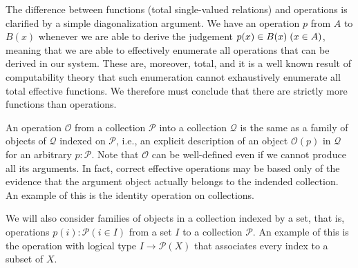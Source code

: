 The difference between functions (total single-valued relations) and operations
is clarified by a simple diagonalization argument. We have an operation $p$
from $A$ to $B(x)$ whenever we are able to derive the judgement
$p(x) \in B(x) \; (x \in A)$, meaning that we are able to effectively enumerate
all operations that can be derived in our system. These are, moreover, total, and
it is a well known result of computability theory that such enumeration cannot
exhaustively enumerate all total effective functions. We therefore must conclude
that there are strictly more functions than operations.

An operation $\mathcal{O}$ from a collection $\mathcal{P}$ into a collection
$\mathcal{Q}$ is the same as a family of objects of $\mathcal{Q}$ indexed on
$\mathcal{P}$, i.e., an explicit description of an object $\mathcal{O}(p)$ in
$\mathcal{Q}$ for an arbitrary $p : \mathcal{P}$. Note that $\mathcal{O}$ can be
well-defined even if we cannot produce all its arguments. In fact, correct
effective operations may be based only of the evidence that the argument object
actually belongs to the indended collection. An example of this is the identity
operation on collections.

We will also consider families of objects in a collection indexed by a set, that
is, operations $p(i) : \mathcal{P} (i \in I)$ from a set $I$ to a collection
$\mathcal{P}$. An example of this is the operation with logical type $I
\rightarrow \mathcal{P}(X)$ that associates every index to a subset of $X$.

